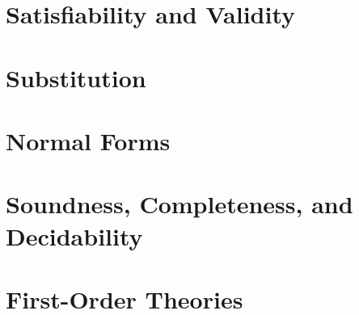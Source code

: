 \section{Satisfiability and Validity}

\section{Substitution}

\section{Normal Forms}

\section{Soundness, Completeness, and Decidability}

\section{First-Order Theories}